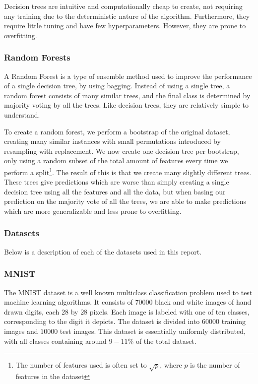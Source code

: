 \documentclass[onecolumn,10pt,cleanfoot]{asme2ej}
\begin{document}
Decision trees are intuitive and computationally cheap to create, not requiring any training due to the deterministic nature of the algorithm. Furthermore, they require little tuning and have few hyperparameters. However, they are prone to overfitting.

\subsubsection{Random Forests}

A Random Forest is a type of ensemble method used to improve the performance of a single decision tree, by using bagging. Instead of using a single tree, a random forest consists of many similar trees, and the final class is determined by majority voting by all the trees. Like decision trees, they are relatively simple to understand.

To create a random forest, we perform a bootstrap of the original dataset, creating many similar instances with small permutations introduced by resampling with replacement. We now create one decision tree per bootstrap, only using a random subset of the total amount of features every time we perform a split\footnote{The number of features used is often set to $\sqrt{p}$, where $p$ is the number of features in the dataset}. The result of this is that we create many slightly different trees. These trees give predictions which are worse than simply creating a single decision tree using all the features and all the data, but when basing our prediction on the majority vote of all the trees, we are able to make predictions which are more generalizable and less prone to overfitting.

\subsubsection{Datasets}

Below is a description of each of the datasets used in this report.

\subsubsection{MNIST}

The MNIST dataset is a well known multiclass classification problem used to test machine learning algorithms. It consists of $70000$ black and white images of hand drawn digits, each $28$ by $28$ pixels. Each image is labeled with one of ten classes, corresponding to the digit it depicts. The dataset is divided into $60000$ training images and $10000$ test images. This dataset is essentially uniformly distributed, with all classes containing around $9 - 11\%$ of the total dataset.
\end{document}
